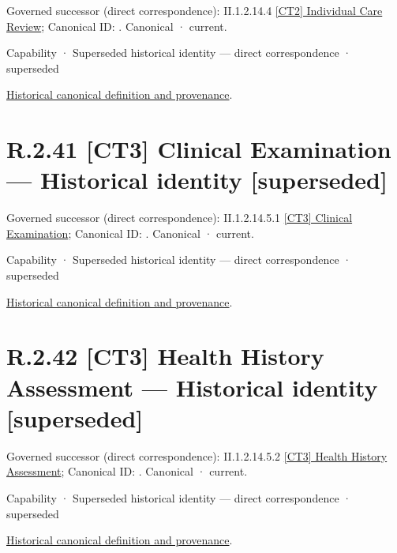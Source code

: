 {\small Governed successor (direct correspondence): II.1.2.14.4 \hyperref[element:625a93f132f242f5a8e2ae1dc19979fb]{[CT2] Individual Care Review}; Canonical ID: \texttt{}. Canonical · current.}\par
\label{element:e1048f6c635d4e16b5384cc2cb45a71b}
{\small Capability · Superseded historical identity — direct correspondence · superseded}\par
\href{../../../../continuum/strategy/capability/e1048f6c635d4e16b5384cc2cb45a71b.md}{Historical canonical definition and provenance}.\par
\section*{R.2.41 [CT3] Clinical Examination — Historical identity [superseded]}
\label{navigation:R.2.41}

{\small Governed successor (direct correspondence): II.1.2.14.5.1 \hyperref[element:8855d4d9e2954e0ab66ab65a556fc61a]{[CT3] Clinical Examination}; Canonical ID: \texttt{}. Canonical · current.}\par
\label{element:8bc15e2b8f114deebcbbe3f2013a8147}
{\small Capability · Superseded historical identity — direct correspondence · superseded}\par
\href{../../../../continuum/strategy/capability/8bc15e2b8f114deebcbbe3f2013a8147.md}{Historical canonical definition and provenance}.\par
\section*{R.2.42 [CT3] Health History Assessment — Historical identity [superseded]}
\label{navigation:R.2.42}

{\small Governed successor (direct correspondence): II.1.2.14.5.2 \hyperref[element:7ea7e3f74e2940a7934b588a1a038834]{[CT3] Health History Assessment}; Canonical ID: \texttt{}. Canonical · current.}\par
\label{element:bcaacf446f45443eafd8e21a1fd74ee1}
{\small Capability · Superseded historical identity — direct correspondence · superseded}\par
\href{../../../../continuum/strategy/capability/bcaacf446f45443eafd8e21a1fd74ee1.md}{Historical canonical definition and provenance}.\par
